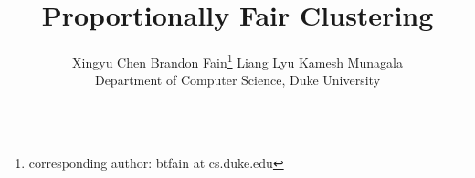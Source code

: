\documentclass{article}
\begin{document}















\title{Proportionally Fair Clustering}
\author{Xingyu Chen \qquad Brandon Fain\thanks{corresponding author: btfain at cs.duke.edu} \qquad Liang Lyu \qquad Kamesh Munagala \\ Department of Computer Science, Duke University}
\date{}
\end{document}
